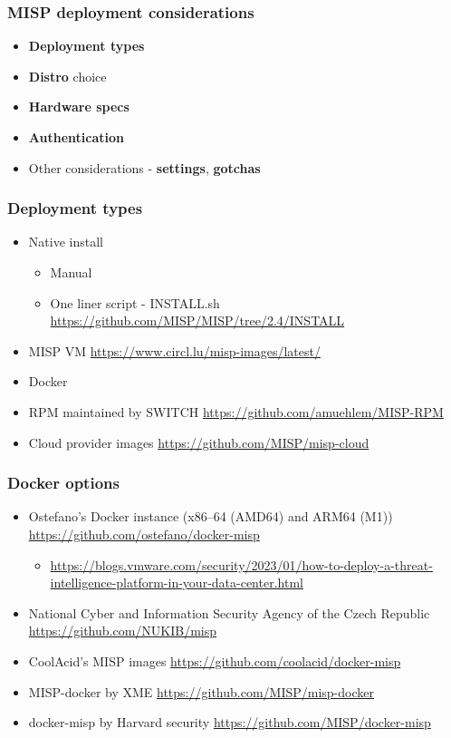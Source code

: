 
\begin{frame}[t,plain]
\titlepage
\end{frame}

\begin{frame}
\frametitle{MISP deployment considerations}
    \begin{itemize}
        \item {\bf Deployment types}
        \item {\bf Distro} choice
        \item {\bf Hardware specs}
        \item {\bf Authentication}
        \item Other considerations - {\bf settings}, {\bf gotchas}
    \end{itemize}
\end{frame}

\begin{frame}
\frametitle{Deployment types}
    \begin{itemize}
        \item Native install
        \begin{itemize}
            \item Manual
            \item One liner script - INSTALL.sh \url{https://github.com/MISP/MISP/tree/2.4/INSTALL}
        \end{itemize}
        \item MISP VM  \url{https://www.circl.lu/misp-images/latest/}
        \item Docker
        \item RPM maintained by SWITCH \url{https://github.com/amuehlem/MISP-RPM}
        \item Cloud provider images  \url {https://github.com/MISP/misp-cloud}
    \end{itemize}
\end{frame}

\begin{frame}
\frametitle{Docker options}
    \begin{itemize}
        \item Ostefano's Docker instance (x86–64 (AMD64) and ARM64 (M1)) \url{https://github.com/ostefano/docker-misp}
        \begin{itemize}
            \item \url{https://blogs.vmware.com/security/2023/01/how-to-deploy-a-threat-intelligence-platform-in-your-data-center.html}
        \end{itemize}
        \item National Cyber and Information Security Agency of the Czech Republic \url{https://github.com/NUKIB/misp}
        \item CoolAcid's MISP images \url{https://github.com/coolacid/docker-misp}
	\item MISP-docker by XME \url{https://github.com/MISP/misp-docker}
        \item docker-misp by Harvard security \url{https://github.com/MISP/docker-misp}
    \end{itemize}
\end{frame}

